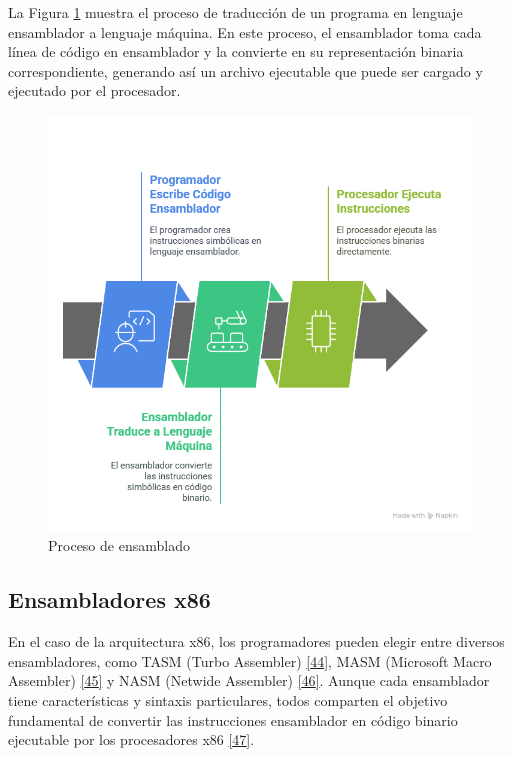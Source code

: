 \documentclass[12pt,oneside]{templates/unerthesis}
\begin{document}
La Figura \ref{fig:ensambla} muestra el proceso de traducción de un programa en lenguaje ensamblador a lenguaje máquina. En este proceso, el ensamblador toma cada línea de código en ensamblador y la convierte en su representación binaria correspondiente, generando así un archivo ejecutable que puede ser cargado y ejecutado por el procesador.

\begin{figure}

{\centering \includegraphics[width=1\linewidth]{images/ensamblador} 

}

\caption{Proceso de ensamblado}\label{fig:ensambla}
\end{figure}

\hypertarget{ensambladores-x86}{%
\subsection{Ensambladores x86}\label{ensambladores-x86}}

En el caso de la arquitectura x86, los programadores pueden elegir entre diversos ensambladores, como TASM (Turbo Assembler) \protect\hyperlink{ref-tasm}{{[}44{]}}, MASM (Microsoft Macro Assembler) \protect\hyperlink{ref-masm}{{[}45{]}} y NASM (Netwide Assembler) \protect\hyperlink{ref-nasm}{{[}46{]}}. Aunque cada ensamblador tiene características y sintaxis particulares, todos comparten el objetivo fundamental de convertir las instrucciones ensamblador en código binario ejecutable por los procesadores x86 \protect\hyperlink{ref-hyde2010art}{{[}47{]}}.
\end{document}
